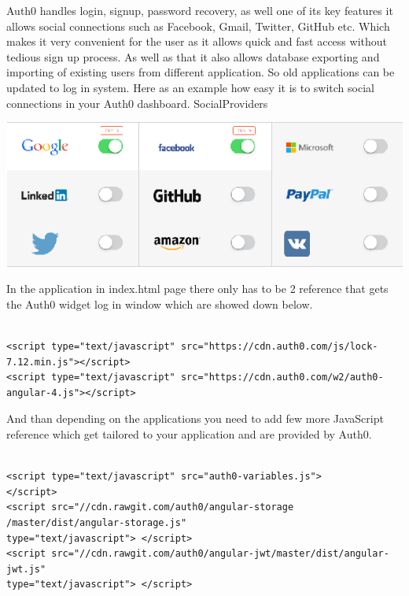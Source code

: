\begin{itemize}
Auth0 handles login, signup, password recovery, as well one of its key features it allows social connections such as Facebook, Gmail, Twitter, GitHub etc. Which makes it very convenient for the user as it allows quick and fast access without tedious sign up process. As well as that it also allows database exporting and importing of existing users from different application. So old applications can be updated to log in system. Here as an example how easy it is to switch social connections in your Auth0 dashboard.
\bigbreak
SocialProviders
\begin{center}    
	\includegraphics{img/SocialProviders.png}
\end{center}

In the application in index.html page there only has to be 2 reference that gets the Auth0 widget log in window which are showed down below.
\begin{verbatim}

<script type="text/javascript" src="https://cdn.auth0.com/js/lock-7.12.min.js"></script>
<script type="text/javascript" src="https://cdn.auth0.com/w2/auth0-angular-4.js"></script>

\end{verbatim}

And than depending on the applications you need to add few more JavaScript reference which get tailored to your application and are provided by Auth0.
\begin{verbatim}

<script type="text/javascript" src="auth0-variables.js">
</script>
<script src="//cdn.rawgit.com/auth0/angular-storage
/master/dist/angular-storage.js" 
type="text/javascript"> </script>
<script src="//cdn.rawgit.com/auth0/angular-jwt/master/dist/angular-jwt.js" 
type="text/javascript"> </script>


\end{verbatim}
\end{itemize}
